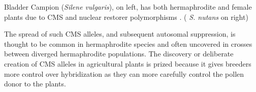 {\begin{marginfigure}
\begin{center}
\end{center}
\caption{Bladder Campion  ({\it Silene vulgaris}), on left, has both 
hermaphrodite and female plants due to CMS and nuclear
restorer polymorphisms \citep{charlesworth1998male}. ({\it
    S. nutans} on right)  } \label{fig:Bladder_Campion}
\end{marginfigure}  %
 The spread of such CMS alleles, and subsequent autosomal suppression, is thought to be common in hermaphrodite
species and often uncovered in crosses between diverged hermaphrodite populations.
The discovery or deliberate creation of CMS alleles in agricultural plants is
prized because it gives breeders more control over hybridization as
they can more carefully control the pollen donor to the plants.

}
